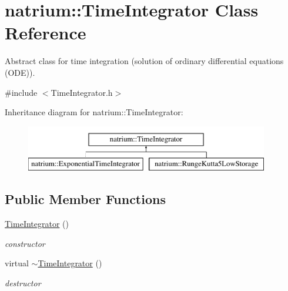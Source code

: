 \hypertarget{classnatrium_1_1TimeIntegrator}{\section{natrium\-:\-:\-Time\-Integrator \-Class \-Reference}
\label{classnatrium_1_1TimeIntegrator}
}


\-Abstract class for time integration (solution of ordinary differential equations (\-O\-D\-E)).  




{\ttfamily \#include $<$\-Time\-Integrator.\-h$>$}

\-Inheritance diagram for natrium\-:\-:\-Time\-Integrator\-:\begin{figure}[H]
\begin{center}
\leavevmode
\includegraphics[height=2.000000cm]{classnatrium_1_1TimeIntegrator}
\end{center}
\end{figure}
\subsection*{\-Public \-Member \-Functions}
\begin{DoxyCompactItemize}
\item 
\hypertarget{classnatrium_1_1TimeIntegrator_aa8c4c55019fbff6a7fa7929772a6915e}{\hyperlink{classnatrium_1_1TimeIntegrator_aa8c4c55019fbff6a7fa7929772a6915e}{\-Time\-Integrator} ()}\label{classnatrium_1_1TimeIntegrator_aa8c4c55019fbff6a7fa7929772a6915e}

\begin{DoxyCompactList}\small\item\em constructor \end{DoxyCompactList}\item 
\hypertarget{classnatrium_1_1TimeIntegrator_ac4f86a5402bf3185f5ed875065c722f2}{virtual \hyperlink{classnatrium_1_1TimeIntegrator_ac4f86a5402bf3185f5ed875065c722f2}{$\sim$\-Time\-Integrator} ()}\label{classnatrium_1_1TimeIntegrator_ac4f86a5402bf3185f5ed875065c722f2}

\begin{DoxyCompactList}\small\item\em destructor \end{DoxyCompactList}\end{DoxyCompactItemize}


